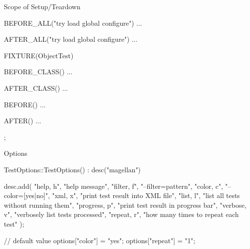 \begin{frame}[fragile]{Scope of Setup/Teardown}
\begin{c++}
BEFORE_ALL("try load global configure")
{ ... }

AFTER_ALL("try load global configure")
{ ... }

FIXTURE(ObjectTest)
{
    BEFORE_CLASS()
    { ... }

    AFTER_CLASS()
    { ... }

    BEFORE()
    { ... }

    AFTER()
    { ... }
};
\end{c++}
\end{frame}

\begin{frame}[fragile]{Options}
\begin{c++}
TestOptions::TestOptions() : desc("magellan")
{
    desc.add({
        {"help,     h",   "help message"},
        {"filter,   f",   "--filter=pattern"},
        {"color,    c",   "--color=[yes|no]"},
        {"xml,      x",   "print test result into XML file"},
        {"list,     l",   "list all tests without running them"},
        {"progress, p",   "print test result in progress bar"},
        {"verbose,  v",   "verbosely list tests processed"},
        {"repeat,   r",   "how many times to repeat each test"}
    });

    // default value
    options["color"]  = "yes";
    options["repeat"] = "1";
}
\end{c++}
\end{frame}

